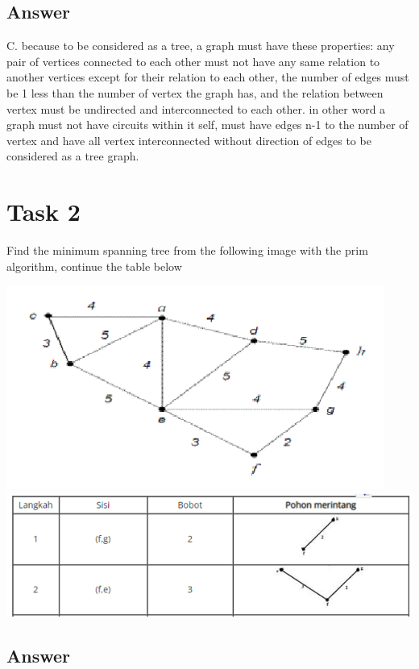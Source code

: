 \documentclass[12pt,titlepage]{article}
\begin{document}
\subsection*{Answer}
C. because to be considered as a tree, a graph must have these properties: any pair of vertices connected to each other must not have any same relation to another vertices except for their relation to each other, the number of edges must be 1 less than the number of vertex the graph has, and the relation between vertex must be undirected and interconnected to each other. in other word a graph must not have circuits within it self, must have edges n-1 to the number of vertex and have all vertex interconnected without direction of edges to be considered as a tree graph.  

\newpage

\section*{Task 2}
Find the minimum spanning tree from the following image with the prim algorithm, continue the table below
\begin{center}
    \includegraphics[width=.6\textwidth]{images/figures/fig2.png}\\
    \includegraphics[width=.8\textwidth]{images/figures/fig3.png}\\
\end{center}

\subsection*{Answer}
\end{document}
